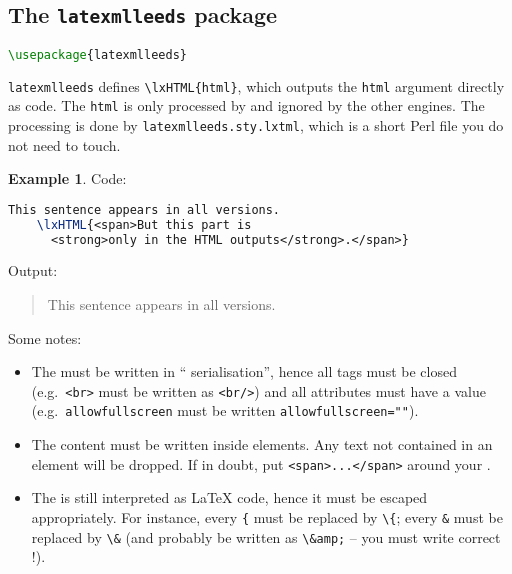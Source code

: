 \documentclass[a4paper]{article}
\theoremstyle{definition}
\newtheorem{exa}{Example}[subsection]
\begin{document}
\subsection{The \texttt{latexmlleeds} package}
\begin{lstlisting}[language=TeX,caption={Import \texttt{latexmlleeds} in the preamble}]
  \usepackage{latexmlleeds}
\end{lstlisting}

\verb|latexmlleeds| defines \verb|\lxHTML{html}|, which outputs the \verb|html| argument directly as \HTML{} code. The \verb|html| is only processed by \LaTeXML{} and ignored by the other engines. The \LaTeXML{} processing is done by \verb|latexmlleeds.sty.lxtml|, which is a short Perl file you do not need to touch.
\begin{exa}
  Code:
  \begin{lstlisting}[language=TeX]
    This sentence appears in all versions.
    \lxHTML{<span>But this part is
      <strong>only in the HTML outputs</strong>.</span>}
  \end{lstlisting}
  Output:
  \begin{quote}
    This sentence appears in all versions.
  \end{quote}
\end{exa}

Some notes:
\begin{itemize}
  \item The \HTML{} must be written in ``\XML{} serialisation'', hence all tags must be closed (e.g.\ \verb|<br>| must be written as \verb|<br/>|) and all attributes must have a value (e.g.\ \verb|allowfullscreen| must be written \verb|allowfullscreen=""|).
  \item The content must be written inside \HTML{} elements. Any text not contained in an element will be dropped. If in doubt, put \verb|<span>...</span>| around your \HTML{}.
  \item The \HTML{} is still interpreted as \LaTeX{} code, hence it must be escaped appropriately. For instance, every \verb|{| must be replaced by \verb|\{|; every \verb|&| must be replaced by \verb|\&| (and probably be written as \verb|\&amp;| -- you must write correct \HTML{}!).
\end{itemize}
\end{document}

